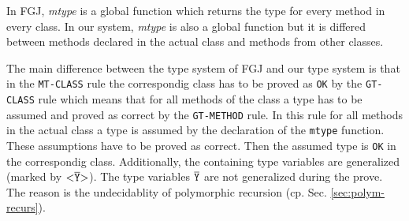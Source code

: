 
\medskip
In FGJ, \textit{mtype} is a global function which returns the type for every method in every class.
In our system, \textit{mtype} is also a global function but it is differed between
methods declared in the actual class and methods from other classes.

The main difference between the type system of FGJ and our type system is that
in the \texttt{MT-CLASS} rule the correspondig class has to be proved as \texttt{OK}
by the \texttt{GT-CLASS} rule which means that for all methods of the class a type has to
be assumed and proved as correct by the \texttt{GT-METHOD} rule.
In this rule
for all methods in the actual class a type is assumed by the
declaration of the \texttt{mtype} function.
These assumptions have to be proved as correct. Then the assumed type is
\texttt{OK} in the correspondig class. Additionally, the containing type
variables are generalized (marked by $\mathtt{ {\tt <} \overline{\tt Y} {\tt >} }$). The type variables
$\overline{\tt \mathtt{Y}}$ are not generalized during the prove. The reason is the
undecidablity of polymorphic recursion (cp. Sec. \ref{sec:polym-recurs}).




